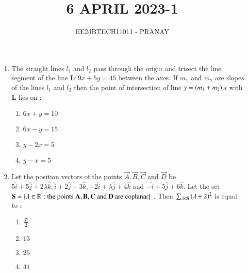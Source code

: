 \documentclass[journal,12pt,onecolumn]{IEEEtran}
\theoremstyle{remark}
\begin{document}

\vspace{3cm}

\title{6 APRIL 2023-1}
\author{EE24BTECH11011 - PRANAY}
\maketitle

\bigskip

\renewcommand{\thefigure}{\theenumi}
\renewcommand{\thetable}{\theenumi}
\begin{enumerate}
    \item The straight lines $l_1$ and $l_2$ pass through the origin and trisect the line segment of the line $\mathbf{L} : 9x + 5y = 45$ between the axes. If $m_1$ and $m_2$ are slopes of the lines $l_1$ and $l_2$ then the point of intersection of line $y = \left(m_1 + m_2\right) x$ with $\mathbf{L}$ lies on : 
    \begin{multicols}{2}
     \begin{enumerate}
         \item $6x + y = 10$
         \item $6x - y =15$\\
         \item $y - 2x = 5$
         \item $y - x =5$
     \end{enumerate}
    \end{multicols}
    \item Let the position vectors of the points $\vec{A} ,\vec{B}, \vec{C}$ and $\vec{D}$ be $5\hat{i}+5\hat{j}+2\lambda \hat{k} , \hat{i}+2\hat{j}+3\hat{k}, -2\hat{i}+\lambda \hat{j}+ 4\hat{k}$ and $-\hat{i}+5\hat{j}+6\hat{k}$. Let the set $\mathbf{S} = \left\{ \lambda \in \mathbb{R} : \text{the points } \mathbf{A} , \mathbf{B}, \mathbf{C} \text{ and } \mathbf{D} \text{ are coplanar}\right\}$ . Then $\sum_{\lambda \in \mathbf{S}}\left(\lambda + 2\right)^2$ is equal to : 
    \begin{multicols}{2}
        \begin{enumerate}
            \item $\frac{37}{2}$\\
            \item $13$
            \item $25$\\
            \item $41$
        \end{enumerate}
    \end{multicols}

\end{enumerate}
\end{document}
